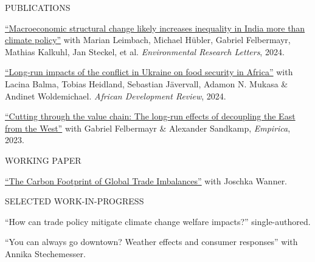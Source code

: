 \documentclass{article}
\begin{document}
\begin{minipage}[t]{0.12\textwidth}
    {\selectfont PUBLICATIONS} \\
\end{minipage}
\hspace{5mm}
\begin{minipage}[t]{0.8\textwidth}
    \href{https://www.doi.org/10.1088/1748-9326/ad34e9}{``Macroeconomic structural change likely increases inequality in India more than climate policy''} with Marian Leimbach, Michael Hübler, Gabriel Felbermayr, Mathias Kalkuhl, Jan Steckel, et al. \textit{Environmental Research Letters}, 2024. \par
    \href{http://doi.org/10.1111/1467-8268.12745}{``Long-run impacts of the conflict in Ukraine on food security in Africa''} with Lacina Balma, Tobias Heidland, Sebastian Jävervall, Adamon N. Mukasa \& Andinet Woldemichael. \textit{African Development Review}, 2024. \par
    \href{https://doi.org/10.1007/s10663-022-09561-w}{``Cutting through the value chain: The long-run effects of decoupling the East from the West''} with Gabriel Felbermayr \& Alexander Sandkamp, \textit{Empirica}, 2023. \par
\end{minipage}
\medskip


\begin{minipage}[t]{0.12\textwidth}
    {\selectfont WORKING PAPER} \\
\end{minipage}
\hspace{5mm}
\begin{minipage}[t]{0.8\textwidth}
    \href{https://www.cesifo.org/en/publications/2023/working-paper/carbon-footprint-global-trade-imbalances}{``The Carbon Footprint of Global Trade Imbalances''} with Joschka Wanner. \par
\end{minipage}
\medskip


\begin{minipage}[t]{0.12\textwidth}
    {\selectfont SELECTED WORK-IN-PROGRESS} \\
\end{minipage}
\hspace{5mm}
\begin{minipage}[t]{0.8\textwidth}
    ``How can trade policy mitigate climate change welfare impacts?'' single-authored.\par
    ``You can always go downtown? Weather effects and consumer responses'' with Annika Stechemesser.\par
\end{minipage}
\medskip
\end{document}
